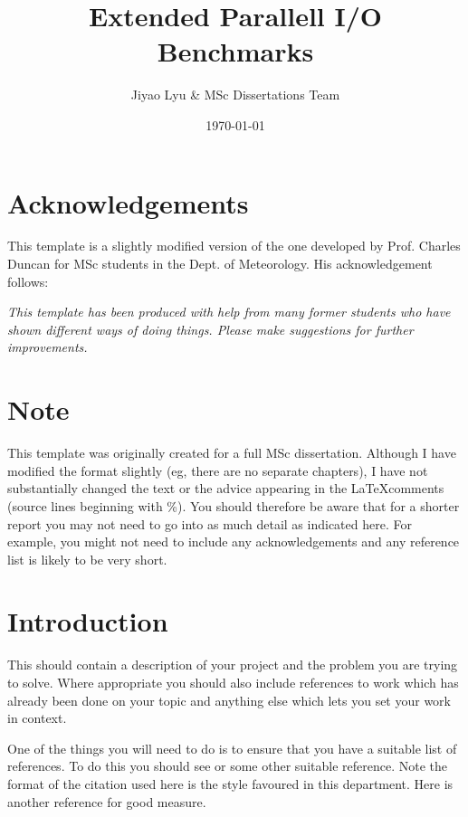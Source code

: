 \documentclass{article}
\begin{document}

\title{Extended Parallell I/O Benchmarks}
\author{Jiyao Lyu \& MSc Dissertations Team}
\date{\today}

\makeEPCCtitle

\newpage

\tableofcontents

\newpage

\section*{Acknowledgements}

This template is a slightly modified version of the one developed by
Prof. Charles Duncan for MSc students in the Dept. of Meteorology. His
acknowledgement follows:

{\em This template has been produced with help from many former students who
have shown different ways of doing things. Please make suggestions for
further improvements.}

\section*{Note}

This template was originally created for a full MSc dissertation.
Although I have modified the format slightly (eg, there are no separate
chapters), I have not substantially changed the text or the advice
appearing in the \LaTeX comments (source lines beginning with \%). You
should therefore be aware that for a shorter report you may
not need to go into as much detail as indicated here. For example, you
might not need to include any acknowledgements and any reference list is
likely to be very short.



\newpage
{}

\section{Introduction}

This should contain a description of your project and the problem you
are trying to solve. Where appropriate you should also include
references to work which has already been done on your topic and
anything else which lets you set your work in context.

One of the things you will need to do is to ensure that you have a
suitable list of references.  To do this you should see \cite{ref:lam}
or some other suitable reference.  Note the format of the citation used
here is the style favoured in this department.  Here is another
reference \cite{ref:bloggs} for good measure.
\end{document}
